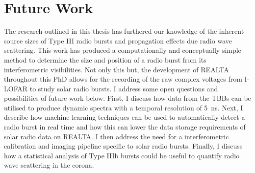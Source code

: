 \section{Future Work}
The research outlined in this thesis has furthered our knowledge of the inherent source sizes of Type III radio bursts and propagation effects due radio wave scattering. This work has produced a computationally and conceptually simple method to determine the size and position of a radio burst from its interferometric visibilities. Not only this but, the development of REALTA throughout this PhD allows for the recording of the raw complex voltages from I-LOFAR to study solar radio bursts. I address some open questions and possibilities of future work below.
First, I discuss how data from the TBBs can be utilised to produce dynamic spectra with a temporal resolution of 5~ns. Next, I describe how machine learning techniques can be used to automatically detect a radio burst in real time and how this can lower the data storage requirements of solar radio data on REALTA. I then address the need for a interferometric calibration and imaging pipeline specific to solar radio bursts. Finally, I discuss how a statistical analysis of Type IIIb bursts could be useful to quantify radio wave scattering in the corona. 
 
